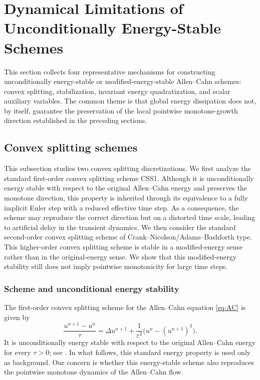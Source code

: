 \documentclass[final, 3p, times]{elsarticle}%
\newcommand{\eps}{\varepsilon}
\begin{document}
\section{Dynamical Limitations of Unconditionally Energy-Stable Schemes}
\label{sec:energy-stable}

This section collects four representative mechanisms for constructing unconditionally energy-stable or modified-energy-stable Allen--Cahn schemes: convex splitting, stabilization, invariant energy quadratization, and scalar auxiliary variables. The common theme is that global energy dissipation does not, by itself, guarantee the preservation of the local pointwise monotone-growth direction established in the preceding sections.

\subsection{Convex splitting schemes}
\label{sec:CSS}

This subsection studies two convex splitting discretizations. We first analyze the standard first-order convex splitting scheme CSS1. Although it is unconditionally energy stable with respect to the original Allen--Cahn energy and preserves the monotone direction, this property is inherited through its equivalence to a fully implicit Euler step with a reduced effective time step. As a consequence, the scheme may reproduce the correct direction but on a distorted time scale, leading to artificial delay in the transient dynamics. We then consider the standard second-order convex splitting scheme of Crank--Nicolson/Adams--Bashforth type. This higher-order convex splitting scheme is stable in a modified-energy sense rather than in the original-energy sense. We show that this modified-energy stability still does not imply pointwise monotonicity for large time steps.

\subsubsection{Scheme and unconditional energy stability}
The first-order convex splitting scheme for the Allen--Cahn equation \eqref{eq:AC} is given by
\begin{equation}
    \frac{u^{n+1}-u^n}{\tau}
    =\Delta u^{n+1}
    +\frac{1}{\eps^2}\bigl(u^n-(u^{n+1})^3\bigr).
    \label{eq:CSS1}
\end{equation}
It is unconditionally energy stable with respect to the original Allen--Cahn
energy for every $\tau>0$; see \cite{eyre1998unconditionally,tangqiao2020phasefield,xu2019stability}.
In what follows, this standard energy property is used only as background. Our concern is whether
this energy-stable scheme also reproduces the pointwise monotone dynamics of the Allen--Cahn flow.
\end{document}
